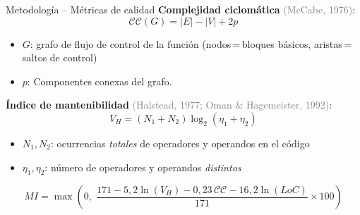 \documentclass[t]{beamer}
\begin{document}
\begin{frame}{Metodología -- Métricas de calidad}
    \vspace{-0.5cm}
    \textbf{Complejidad ciclomática} {\footnotesize\textcolor{gray}{(McCabe, 1976)}}:
    \begin{equation*}
        \mathcal{CC}(G) = |E| - |V| + 2p
    \end{equation*}
    \vspace{-0.35cm}
    {\footnotesize\color{gray}
    \begin{itemize}\setlength{\itemsep}{1pt}
        \item $G$: grafo de flujo de control de la función (nodos\,=\,bloques básicos, aristas\,=\,saltos de control)
        \item $p$: Componentes conexas del grafo.
    \end{itemize}}

    \vspace{0.1cm}
    \textbf{Índice de mantenibilidad} {\footnotesize\textcolor{gray}{(Halstead, 1977; Oman \& Hagemeister, 1992)}}:
    \begin{equation*}
        V_H = (N_1 + N_2)\log_2(\eta_1 + \eta_2)
    \end{equation*}
    \vspace{-0.35cm}
    {\footnotesize\color{gray}
    \begin{itemize}\setlength{\itemsep}{1pt}
        \item $N_1, N_2$: ocurrencias \emph{totales} de operadores y operandos en el código
        \item $\eta_1, \eta_2$: número de operadores y operandos \emph{distintos}
    \end{itemize}}
    \vspace{-0.4cm}
    \begin{equation*}
        MI = \max\!\left(0,\;\frac{171 - 5{,}2\ln(V_H) - 0{,}23\,\mathcal{CC} - 16{,}2\ln(LoC)}{171} \times 100\right)
    \end{equation*}
\end{frame}
\end{document}
